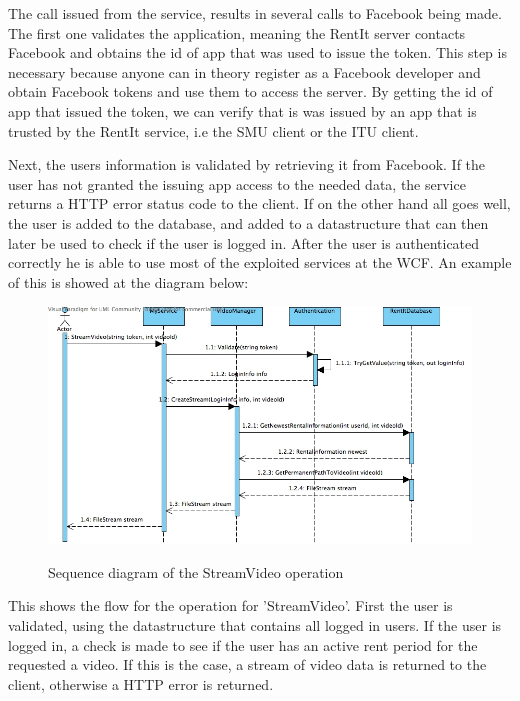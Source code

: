 The call issued from the service, results in several calls to Facebook being made. The first one validates the application, meaning the RentIt server contacts Facebook and obtains the id of app that was used to issue the token. This step is necessary because anyone can in theory register as a Facebook developer and obtain Facebook tokens and use them to access the server. By getting the id of app that issued the token, we can verify that is was issued by an app that is trusted by the RentIt service, i.e the SMU client or the ITU client.

Next, the users information is validated by retrieving it from Facebook. If the user has not granted the issuing app access to the needed data, the service returns a HTTP error status code to the client. If on the other hand all goes well, the user is added to the database, and added to a datastructure that can then later be used to check if the user is logged in.
After the user is authenticated correctly he is able to use most of the exploited services at the WCF. An example of this is showed at the diagram below:

\begin{figure}[H]
\centering
\includegraphics[scale=0.35]{StreamVideo.jpg}
\label{streamvideo}
\caption{Sequence diagram of the StreamVideo operation}
\end{figure}

This shows the flow for the operation for 'StreamVideo'. First the user is validated, using the datastructure that contains all logged in users. If the user is logged in, a check is made to see if the user has an active rent period for the requested a video. If this is the case, a stream of video data is returned to the client, otherwise a HTTP error is returned.
